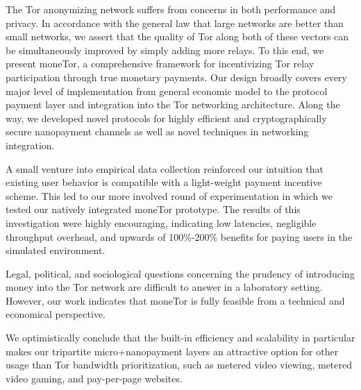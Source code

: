 The Tor anonymizing network suffers from concerns in both performance and
privacy. In accordance with the general law that large networks are better than
small networks, we assert that the quality of Tor along both of these vectors
can be simultaneously improved by simply adding more relays. To this end, we
present moneTor, a comprehensive framework for incentivizing Tor relay
participation through true monetary payments. Our design broadly covers every
major level of implementation from general economic model to the protocol
payment layer and integration into the Tor networking architecture. Along the
way, we developed novel protocols for highly efficient and cryptographically
secure nanopayment channels as well as novel techniques in networking
integration.

A small venture into empirical data collection reinforced our intuition that
existing user behavior is compatible with a light-weight payment incentive
scheme. This led to our more involved round of experimentation in which we
tested our natively integrated moneTor prototype. The results of this
investigation were highly encouraging, indicating low latencies, negligible
throughput overhead, and upwards of 100\%-200\% benefits for paying users in the
simulated environment.

Legal, political, and sociological questions concerning the prudency of
introducing money into the Tor network are difficult to answer in a laboratory
setting. However, our work indicates that moneTor is fully feasible from a
technical and economical perspective.

We optimistically conclude that the built-in efficiency and scalability in particular makes our tripartite micro+nanopayment layers an attractive option for other usage than Tor bandwidth prioritization, such as metered video viewing, metered video gaming, and pay-per-page websites.
